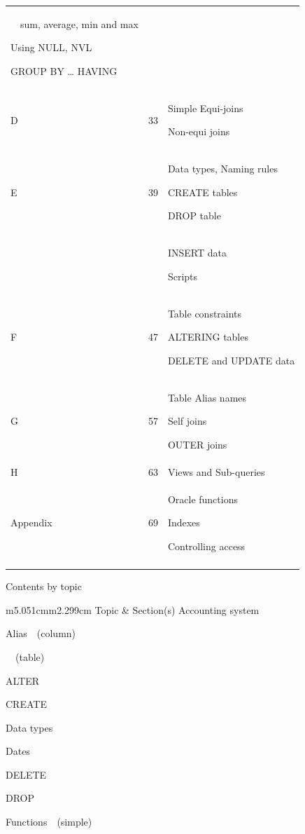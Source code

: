 \documentclass{report}
\makeatletter
\newcommand\arraybslash{\let\\\@arraycr}
\makeatother
\begin{document}
\begin{flushleft}
{\begin{center}
\begin{minipage}{13.25cm}
\begin{flushleft}
\begin{supertabular}{m{2.1069999cm}m{1.433cm}m{21.439cm}}
\ \ sum, average, min and max

Using NULL, NVL

GROUP BY {\dots} HAVING\\
\centering D &
33 &
Simple Equi-joins

Non-equi joins\\
\centering E &
39 &
Data types, Naming rules 

CREATE tables

DROP table\\
 &
 &
INSERT data

Scripts\\
\centering F &
47 &
Table constraints

ALTERING tables

DELETE and UPDATE data\\
\centering G &
57 &
Table Alias names

Self joins

OUTER joins\\
\centering H &
63 &
Views and Sub-queries \\
\centering Appendix &
69 &
Oracle functions 

Indexes

Controlling access\\
 &
 &
\\
\end{supertabular}
\end{flushleft}
\end{minipage}
\end{center}

\begin{center}
\begin{minipage}{7.999cm}
Contents by topic

\begin{flushleft}
\tablefirsthead{}
\tablehead{}
\tabletail{}
\tablelasttail{}
\begin{supertabular}{m{5.051cm}m{2.299cm}}
\centering Topic &
\centering\arraybslash Section(s)\\
Accounting system

Alias\ \ (column)

\ \ (table)

ALTER 

CREATE

Data types

Dates

DELETE

DROP

Functions\ \ (simple)


\end{supertabular}
\end{flushleft}
\end{minipage}
\end{center}}
\end{flushleft}
\end{document}
